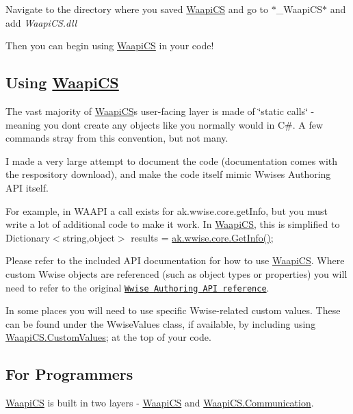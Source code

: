 Navigate to the directory where you saved \mbox{\hyperlink{namespace_waapi_c_s}{Waapi\+CS}} and go to $\ast$\+\_\+\+Waapi\+CS$\ast$ and add {\itshape Waapi\+C\+S.\+dll}

Then you can begin using \mbox{\hyperlink{namespace_waapi_c_s}{Waapi\+CS}} in your code!

\subsection*{Using \mbox{\hyperlink{namespace_waapi_c_s}{Waapi\+CS}}}

The vast majority of \mbox{\hyperlink{namespace_waapi_c_s}{Waapi\+CS}}\textquotesingle{}s user-\/facing layer is made of \char`\"{}static calls\char`\"{} -\/ meaning you don\textquotesingle{}t create any objects like you normally would in C\#. A few commands stray from this convention, but not many.

I made a very large attempt to document the code (documentation comes with the respository download), and make the code itself mimic Wwise\textquotesingle{}s Authoring A\+PI itself.

For example, in W\+A\+A\+PI a call exists for {\ttfamily ak.\+wwise.\+core.\+get\+Info}, but you must write a lot of additional code to make it work. In \mbox{\hyperlink{namespace_waapi_c_s}{Waapi\+CS}}, this is simplified to {\ttfamily Dictionary$<$string,object$>$ results = \mbox{\hyperlink{classak_1_1wwise_1_1core_a0794d63ebaa3fc1a3c79d155978030ce}{ak.\+wwise.\+core.\+Get\+Info()}};}

Please refer to the included A\+PI documentation for how to use \mbox{\hyperlink{namespace_waapi_c_s}{Waapi\+CS}}. Where custom Wwise objects are referenced (such as object types or properties) you will need to refer to the original \href{https://www.audiokinetic.com/library/edge/?source=SDK&id=waapi__index.html}{\tt Wwise Authoring A\+PI reference}.

In some places you will need to use specific Wwise-\/related custom values. These can be found under the {\ttfamily Wwise\+Values} class, if available, by including {\ttfamily using \mbox{\hyperlink{namespace_waapi_c_s_1_1_custom_values}{Waapi\+C\+S.\+Custom\+Values}};} at the top of your code.

\subsection*{For Programmers}

\mbox{\hyperlink{namespace_waapi_c_s}{Waapi\+CS}} is built in two layers -\/ \mbox{\hyperlink{namespace_waapi_c_s}{Waapi\+CS}} and \mbox{\hyperlink{namespace_waapi_c_s_1_1_communication}{Waapi\+C\+S.\+Communication}}.

